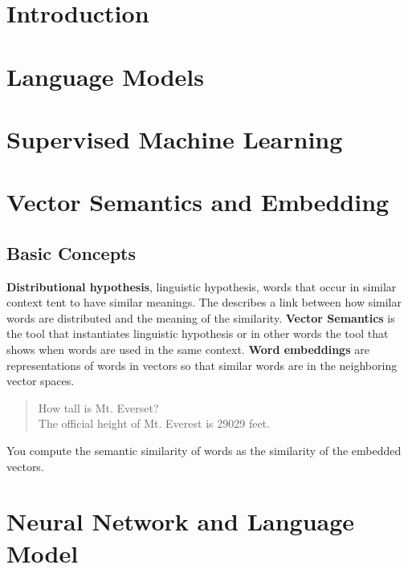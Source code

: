 \documentclass{book}
\begin{document}
\chapter{Introduction}
\chapter{Language Models}
\chapter{Supervised Machine Learning}
\chapter{Vector Semantics and Embedding}
\section{Basic Concepts}
\textbf{Distributional hypothesis}, linguistic hypothesis, words that occur in similar context tent to have similar meanings. The describes a link between how similar words are distributed and the meaning of the similarity. 
\textbf{Vector Semantics} is the tool that instantiates linguistic hypothesis or in other words the tool that shows when words are used in the same context. 
\textbf{Word embeddings} are representations of words in vectors so that similar words are in the neighboring vector spaces. 
\begin{quote}
	How tall is Mt. Everset? \\
	The official height of Mt. Everest is 29029 feet. 
\end{quote}
You compute the semantic similarity of words as the similarity of the embedded vectors. 
\chapter{Neural Network and Language Model}
\end{document}
